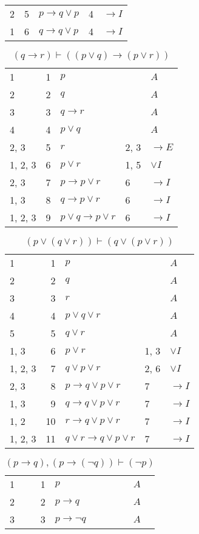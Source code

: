\documentclass{article}
\begin{document}
\begin{table}[htbp]
\begin{tabular}{lrlll}
{2} & 5 & $p→q∨p$ & {4} & $→I$ \\
{1} & 6 & $q→q∨p$ & {4} & $→I$ \\
\end{tabular}
\end{table}\begin{table}[htbp]\caption*{$(q→r) ⊢ ((p∨q)→(p∨r))$}\centering\begin{tabular}{lrlll}
{1} & 1 & $p$ & {} & $A$ \\
{2} & 2 & $q$ & {} & $A$ \\
{3} & 3 & $q→r$ & {} & $A$ \\
{4} & 4 & $p∨q$ & {} & $A$ \\
{2, 3} & 5 & $r$ & {2, 3} & $→E$ \\
{1, 2, 3} & 6 & $p∨r$ & {1, 5} & $∨I$ \\
{2, 3} & 7 & $p→p∨r$ & {6} & $→I$ \\
{1, 3} & 8 & $q→p∨r$ & {6} & $→I$ \\
{1, 2, 3} & 9 & $p∨q→p∨r$ & {6} & $→I$ \\
\end{tabular}
\end{table}\begin{table}[htbp]\caption*{$(p∨(q∨r)) ⊢ (q∨(p∨r))$}\centering\begin{tabular}{lrlll}
{1} & 1 & $p$ & {} & $A$ \\
{2} & 2 & $q$ & {} & $A$ \\
{3} & 3 & $r$ & {} & $A$ \\
{4} & 4 & $p∨q∨r$ & {} & $A$ \\
{5} & 5 & $q∨r$ & {} & $A$ \\
{1, 3} & 6 & $p∨r$ & {1, 3} & $∨I$ \\
{1, 2, 3} & 7 & $q∨p∨r$ & {2, 6} & $∨I$ \\
{2, 3} & 8 & $p→q∨p∨r$ & {7} & $→I$ \\
{1, 3} & 9 & $q→q∨p∨r$ & {7} & $→I$ \\
{1, 2} & 10 & $r→q∨p∨r$ & {7} & $→I$ \\
{1, 2, 3} & 11 & $q∨r→q∨p∨r$ & {7} & $→I$ \\
\end{tabular}
\end{table}\begin{table}[htbp]\caption*{$(p→q),(p→(¬q)) ⊢ (¬p)$}\centering\begin{tabular}{lrlll}
{1} & 1 & $p$ & {} & $A$ \\
{2} & 2 & $p→q$ & {} & $A$ \\
{3} & 3 & $p→ ¬q$ & {} & $A$ \\

\end{tabular}
\end{table}
\end{document}
